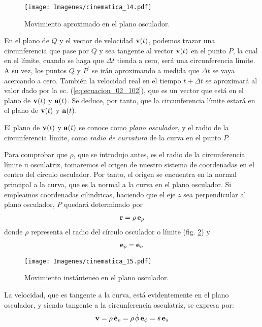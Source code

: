 \begin{figure}[H]
    \centering
    \texttt{[image: Imagenes/cinematica\_14.pdf]}
    \caption{Movimiento aproximado en el plano osculador.}
    \label{fig:figura_02_14}
\end{figure}
En el plano de $Q$ y el vector de velocidad $\vb{v} (t)$, podemos trazar una circunferencia que pase por $Q$ y sea tangente al vector $\vb{v} (t)$ en el punto $P$, la cual en el límite, cuando se haga que $\Delta t$ tienda a cero, será una circunferencia límite. A su vez, los puntos $Q$ y $P^{\prime}$ se irán aproximando a medida que $\Delta t$ se vaya acercando a cero. También la velocidad real en el tiempo $t + \Delta t$ se aproximará al valor dado por la ec. (\ref{eq:ecuacion_02_102}), que es un vector que está en el plano de $\vb{v} (t)$ y $\vb{a} (t)$. Se deduce, por tanto, que la circunferencia límite estará en el plano de $\vb{v} (t)$ y $\vb{a} (t)$. 
\par
El plano de $\vb{v} (t)$ y $\vb{a} (t)$ se conoce como \emph{plano osculador}, y el radio de la circunferencia límite, como \emph{radio de curvatura} de la curva en el punto $P$.
\par
Para comprobar que $\rho$, que se introdujo antes, es el radio de la circunferencia límite u osculatriz, tomaremos el origen de nuestro sistema de coordenadas en el centro del círculo osculador. Por tanto, el origen se encuentra en la normal principal a la curva, que es la normal a la curva en el plano osculador. Si empleamos coordenadas cilindricas, haciendo que el eje $z$ sea perpendicular al plano osculador, $P$ quedará determinado por 
\begin{align}
    \vb{r} = \rho \, \vb{e}_{\rho}
    \label{eq:ecuacion_02_103}
\end{align}
donde $\rho$ representa el radio del círculo osculador o límite (fig. \ref{fig:figura_02_15}) y 
\begin{align*}
    \vb{e}_{\rho} = \vb{e}_{n}
\end{align*}
\begin{figure}[H]
    \centering
    \texttt{[image: Imagenes/cinematica\_15.pdf]}
    \caption{Movimiento instánteneo en el plano osculador.}
    \label{fig:figura_02_15}
\end{figure}
La velocidad, que es tangente a la curva, está evidentemente en el plano osculador, y siendo tangente a la circunferencia osculatriz, se expresa por:
\begin{align}
    \vb{v} = \rho \, \dot{\vb{e}}_{\rho} = \rho \, \dot{\phi} \, \vb{e}_{\phi} = \dot{s} \, \vb{e}_{s}
    \label{eq:ecuacion_02_104}
\end{align}
